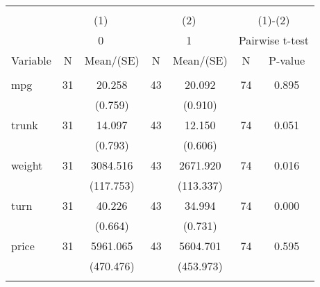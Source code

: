 
\begin{tabular}{@{\extracolsep{5pt}}lcccccc}
\\[-1.8ex]\hline \hline \\[-1.8ex]
 & \multicolumn{2}{c}{(1)}  & \multicolumn{2}{c}{(2)}  & \multicolumn{2}{c}{(1)-(2)} \\
 & \multicolumn{2}{c}{0}  & \multicolumn{2}{c}{1}  & \multicolumn{2}{c}{Pairwise t-test}  \\
Variable & N & Mean/(SE) & N & Mean/(SE) & N & P-value \\ \hline \\[-1.8ex] 
mpg   & 31    & 20.258    & 43    & 20.092    & 74    & 0.895   \\
 &   & (0.759)  &   & (0.910)  &   &  \\ [1ex]
trunk   & 31    & 14.097    & 43    & 12.150    & 74    & 0.051   \\
 &   & (0.793)  &   & (0.606)  &   &  \\ [1ex]
weight   & 31    & 3084.516    & 43    & 2671.920    & 74    & 0.016   \\
 &   & (117.753)  &   & (113.337)  &   &  \\ [1ex]
turn   & 31    & 40.226    & 43    & 34.994    & 74    & 0.000   \\
 &   & (0.664)  &   & (0.731)  &   &  \\ [1ex]
price   & 31    & 5961.065    & 43    & 5604.701    & 74    & 0.595   \\
 &   & (470.476)  &   & (453.973)  &   &  \\ [1ex]
\hline \hline \\[-1.8ex]

\end{tabular}
